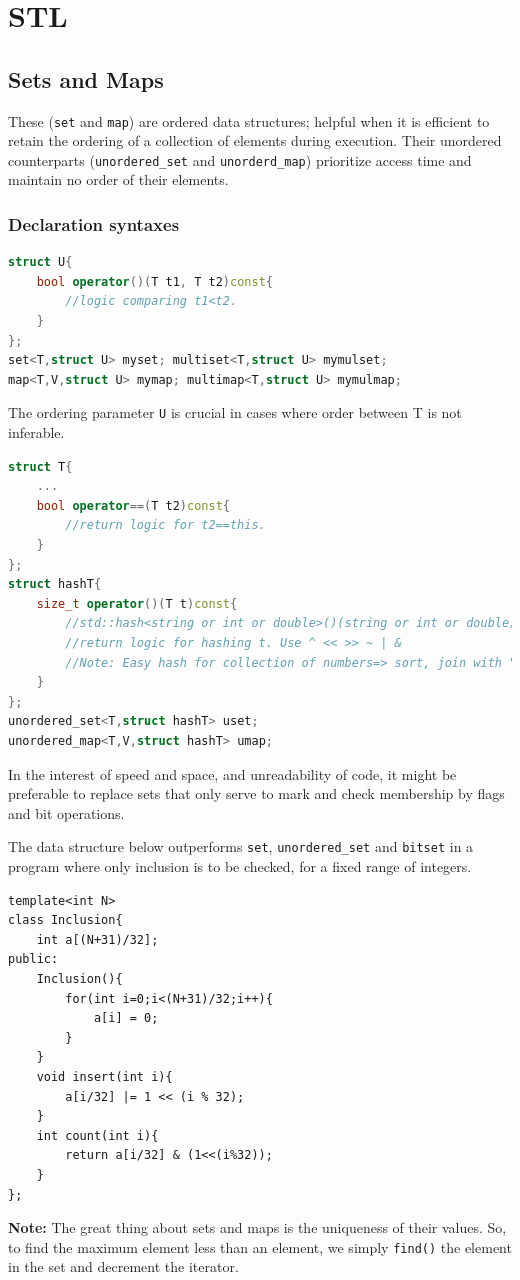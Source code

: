\documentclass{report}
\begin{document}
\section{STL}
\subsection{Sets and Maps}
These (\texttt{set} and \texttt{map}) are ordered data structures; helpful when
it is efficient to retain the ordering of a collection of elements during execution.
Their unordered counterparts (\texttt{unordered\_set} and \texttt{unorderd\_map})
prioritize access time and maintain no order of their elements.
\subsubsection*{Declaration syntaxes}
\begin{lstlisting}[caption={Sets and Maps},language=C++]
struct U{
    bool operator()(T t1, T t2)const{
        //logic comparing t1<t2.
    }
};
set<T,struct U> myset; multiset<T,struct U> mymulset;
map<T,V,struct U> mymap; multimap<T,struct U> mymulmap;
\end{lstlisting}
The ordering parameter \texttt{U} is crucial in cases where order between T is not inferable.
\begin{lstlisting}[caption={Unordered sets and maps},language=C++]
struct T{
    ...
    bool operator==(T t2)const{
        //return logic for t2==this.
    }
};
struct hashT{
    size_t operator()(T t)const{
        //std::hash<string or int or double>()(string or int or double)
        //return logic for hashing t. Use ^ << >> ~ | &
        //Note: Easy hash for collection of numbers=> sort, join with ","
    }
};
unordered_set<T,struct hashT> uset;
unordered_map<T,V,struct hashT> umap;
\end{lstlisting}
In the interest of speed and space, and unreadability of code, it might be
preferable to replace sets that only serve to mark and check membership
by flags and bit operations.\\
\begin{center}
\end{center}
The data structure below outperforms \texttt{set}, \texttt{unordered\_set} and \texttt{bitset} in a program where only inclusion is to be checked, for a fixed range of integers.
\begin{lstlisting}
template<int N>
class Inclusion{
    int a[(N+31)/32];
public:
    Inclusion(){
        for(int i=0;i<(N+31)/32;i++){
            a[i] = 0;
        }
    }
    void insert(int i){
        a[i/32] |= 1 << (i % 32);
    }
    int count(int i){
        return a[i/32] & (1<<(i%32));
    }
};
\end{lstlisting}
\textbf{Note:} The great thing about sets and maps is the uniqueness of their values.
So, to find the maximum element less than an element, we simply \texttt{find()} the element
in the set and decrement the iterator.
\end{document}
